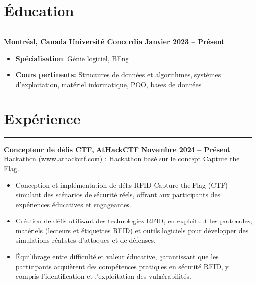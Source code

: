 \documentclass[10pt]{article}
\begin{document}
\vspace{-8mm}

\section*{Éducation}
\vspace{-2mm}
\hrule
\vspace{0mm}

\textbf{Montréal, Canada} \hfill \textbf{Université Concordia} \hfill \textbf{Janvier 2023 -- Présent} 
\vspace{-4mm}
\begin{itemize}[left=0.15in, itemsep=0pt]
    \item \textbf{Spécialisation:} Génie logiciel, BEng
    \item \textbf{Cours pertinents:} Structures de données et algorithmes, systèmes d'exploitation, matériel informatique, POO, bases de données
\end{itemize}

\section*{Expérience}
\vspace{-2mm}
\hrule
\vspace{0mm}

\textbf{Concepteur de défis CTF, } \hfill \textbf{AtHackCTF} \hfill \textbf{Novembre 2024 -- Présent} \\
{Hackathon {\href{https://www.athackctf.com}{(www.athackctf.com)} : Hackathon basé sur le concept Capture the Flag.}}
\vspace{-4mm}
\begin{itemize}[left=0.15in, itemsep=0pt]
    \item Conception et implémentation de défis RFID Capture the Flag (CTF) simulant des scénarios de sécurité réels, offrant aux participants des expériences éducatives et engageantes.
    \item Création de défis utilisant des technologies RFID, en exploitant les protocoles, matériels (lecteurs et étiquettes RFID) et outils logiciels pour développer des simulations réalistes d'attaques et de défenses.
    \item Équilibrage entre difficulté et valeur éducative, garantissant que les participants acquièrent des compétences pratiques en sécurité RFID, y compris l'identification et l'exploitation des vulnérabilités.
\end{itemize}
\end{document}
